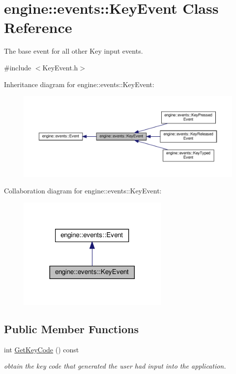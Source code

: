 \hypertarget{classengine_1_1events_1_1KeyEvent}{}\section{engine\+:\+:events\+:\+:Key\+Event Class Reference}
\label{classengine_1_1events_1_1KeyEvent}


The base event for all other Key input events.  




{\ttfamily \#include $<$Key\+Event.\+h$>$}



Inheritance diagram for engine\+:\+:events\+:\+:Key\+Event\+:\nopagebreak
\begin{figure}[H]
\begin{center}
\leavevmode
\includegraphics[width=350pt]{classengine_1_1events_1_1KeyEvent__inherit__graph}
\end{center}
\end{figure}


Collaboration diagram for engine\+:\+:events\+:\+:Key\+Event\+:\nopagebreak
\begin{figure}[H]
\begin{center}
\leavevmode
\includegraphics[width=209pt]{classengine_1_1events_1_1KeyEvent__coll__graph}
\end{center}
\end{figure}
\subsection*{Public Member Functions}
\begin{DoxyCompactItemize}
\item 
int \hyperlink{classengine_1_1events_1_1KeyEvent_a2140c6615ec67c2f0cca0b1932968947}{Get\+Key\+Code} () const
\begin{DoxyCompactList}\small\item\em obtain the key code that generated the user had input into the application. \end{DoxyCompactList}\end{DoxyCompactItemize}
